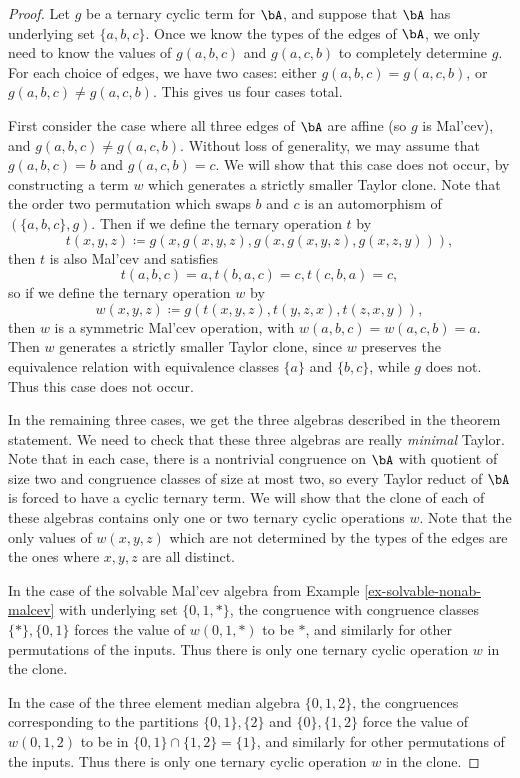 \begin{proof} Let $g$ be a ternary cyclic term for $\bA$, and suppose that $\bA$ has underlying set $\{a,b,c\}$. Once we know the types of the edges of $\bA$, we only need to know the values of $g(a,b,c)$ and $g(a,c,b)$ to completely determine $g$. For each choice of edges, we have two cases: either $g(a,b,c) = g(a,c,b)$, or $g(a,b,c) \ne g(a,c,b)$. This gives us four cases total.

First consider the case where all three edges of $\bA$ are affine (so $g$ is Mal'cev), and $g(a,b,c) \ne g(a,c,b)$. Without loss of generality, we may assume that $g(a,b,c) = b$ and $g(a,c,b) = c$. We will show that this case does not occur, by constructing a term $w$ which generates a strictly smaller Taylor clone. Note that the order two permutation which swaps $b$ and $c$ is an automorphism of $(\{a,b,c\},g)$. Then if we define the ternary operation $t$ by
\[
t(x,y,z) \coloneqq g(x,g(x,y,z),g(x,g(x,y,z),g(x,z,y))),
\]
then $t$ is also Mal'cev and satisfies
\[
t(a,b,c) = a, t(b,a,c) = c, t(c,b,a) = c,
\]
so if we define the ternary operation $w$ by
\[
w(x,y,z) \coloneqq g(t(x,y,z),t(y,z,x),t(z,x,y)),
\]
then $w$ is a symmetric Mal'cev operation, with $w(a,b,c) = w(a,c,b) = a$. Then $w$ generates a strictly smaller Taylor clone, since $w$ preserves the equivalence relation with equivalence classes $\{a\}$ and $\{b,c\}$, while $g$ does not. Thus this case does not occur.

In the remaining three cases, we get the three algebras described in the theorem statement. We need to check that these three algebras are really \emph{minimal} Taylor. Note that in each case, there is a nontrivial congruence on $\bA$ with quotient of size two and congruence classes of size at most two, so every Taylor reduct of $\bA$ is forced to have a cyclic ternary term. We will show that the clone of each of these algebras contains only one or two ternary cyclic operations $w$. Note that the only values of $w(x,y,z)$ which are not determined by the types of the edges are the ones where $x,y,z$ are all distinct.

In the case of the solvable Mal'cev algebra from Example \ref{ex-solvable-nonab-malcev} with underlying set $\{0,1,*\}$, the congruence with congruence classes $\{*\}, \{0,1\}$ forces the value of $w(0,1,*)$ to be $*$, and similarly for other permutations of the inputs. Thus there is only one ternary cyclic operation $w$ in the clone.

In the case of the three element median algebra $\{0,1,2\}$, the congruences corresponding to the partitions $\{0,1\},\{2\}$ and $\{0\},\{1,2\}$ force the value of $w(0,1,2)$ to be in $\{0,1\} \cap \{1,2\} = \{1\}$, and similarly for other permutations of the inputs. Thus there is only one ternary cyclic operation $w$ in the clone.


\end{proof}
